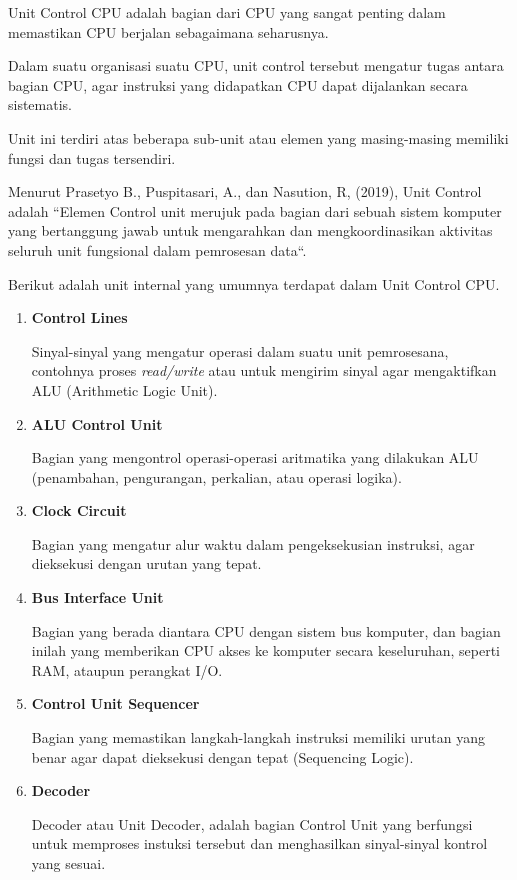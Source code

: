 Unit Control CPU adalah bagian dari CPU yang sangat penting dalam memastikan CPU
berjalan sebagaimana seharusnya.

Dalam suatu organisasi suatu CPU, unit control tersebut mengatur tugas antara
bagian CPU, agar instruksi yang didapatkan CPU dapat dijalankan secara sistematis.

Unit ini terdiri atas beberapa sub-unit atau elemen yang masing-masing memiliki
fungsi dan tugas tersendiri.

Menurut Prasetyo B., Puspitasari, A., dan Nasution, R, (2019), Unit Control adalah ``Elemen Control unit merujuk pada bagian dari sebuah sistem komputer yang bertanggung jawab
untuk mengarahkan dan mengkoordinasikan aktivitas seluruh unit fungsional dalam pemrosesan data``.

Berikut adalah unit internal yang umumnya terdapat dalam Unit Control CPU.

\begin{enumerate}[label=\alph*.]

  \item \textbf{ Control Lines}

    Sinyal-sinyal yang mengatur operasi dalam suatu unit pemrosesana, contohnya
    proses \textit{read/write} atau untuk mengirim sinyal agar mengaktifkan ALU
    (Arithmetic Logic Unit).

  \item \textbf{ ALU Control Unit}

    Bagian yang mengontrol operasi-operasi aritmatika yang dilakukan ALU
    (penambahan, pengurangan, perkalian, atau operasi logika).


  \item \textbf{ Clock Circuit }

    Bagian yang mengatur alur waktu dalam pengeksekusian instruksi, agar
    dieksekusi dengan urutan yang tepat.

  \item \textbf{ Bus Interface Unit }

    Bagian yang berada diantara CPU dengan sistem bus komputer, dan bagian inilah
    yang memberikan CPU akses ke komputer secara keseluruhan, seperti RAM, ataupun
    perangkat I/O.

  \item \textbf{ Control Unit Sequencer }

    Bagian yang memastikan langkah-langkah instruksi memiliki urutan yang benar
    agar dapat dieksekusi dengan tepat (Sequencing Logic).

  \item \textbf{ Decoder }

    Decoder atau Unit Decoder, adalah bagian Control Unit yang berfungsi
    untuk memproses instuksi tersebut dan menghasilkan sinyal-sinyal kontrol
    yang sesuai.

\end{enumerate}
